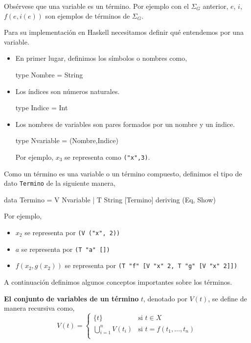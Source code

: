 Obsérvese que una variable es un término.  Por ejemplo con el $\Sigma_G$
anterior, $e$, $i$, $f(e,i(e))$ son ejemplos de términos de $\Sigma_G$.

Para su implementación en Haskell necesitamos definir qué
entendemos por una variable. 

\begin{itemize}

\item En primer lugar, definimos los símbolos o nombres como,
\begin{codigo}
type Nombre = String
\end{codigo}

\item Los índices son números naturales.

\begin{codigo}
type Indice = Int
\end{codigo}

\item Los nombres de variables son pares formados por un nombre y un índice.
\begin{codigo}
type Nvariable = (Nombre,Indice)
\end{codigo}
Por ejemplo, $x_3$ se representa como \texttt{("x",3)}.

\end{itemize}

Como un término es una variable o un término compuesto, definimos el
tipo de dato \texttt{Termino} de la siguiente manera,
\begin{codigo}
data Termino = V Nvariable
             | T String [Termino]
             deriving (Eq, Show)
\end{codigo}

Por ejemplo,
\begin{itemize}
\item $x_2$ se representa por \texttt{(V ("x", 2))}
\item $a$ se representa por \texttt{(T "a" [])}
\item $f(x_2,g(x_2))$ se representa por \texttt{(T "f" [V "x" 2, T "g"
    [V "x" 2]])}
\end{itemize}

A continuación definimos algunos conceptos importantes sobre los
términos.\begin{defi} \textbf{El conjunto de variables de un término} $t$, denotado por
  $V(t)$, se define de manera recursiva como,
  \begin{equation*}
    V(t)=
    \left\lbrace
      \begin{array}{ll}
        \{ t \} & \text{si } t \in X \\
        \displaystyle \bigcup^n_{i=1} V(t_i) & \text{si } t = f(t_1, \dots, t_n)\\
      \end{array}
    \right.
  \end{equation*}
\end{defi}

